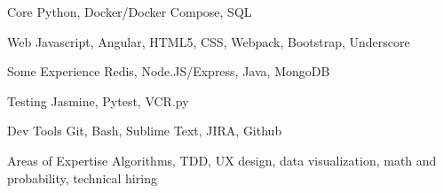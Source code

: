 

\begin{cvskills}

  \cvskill
    {Core}
    {Python, Docker/Docker Compose, SQL}

  \cvskill
    {Web}
    {Javascript, Angular, HTML5, CSS, Webpack, Bootstrap, Underscore}

  \cvskill
    {Some Experience}
    {Redis, Node.JS/Express, Java, MongoDB}

  \cvskill
    {Testing}
    {Jasmine, Pytest, VCR.py}

  \cvskill
    {Dev Tools}
    {Git, Bash, Sublime Text, JIRA, Github}

  \cvskill
    {Areas of Expertise}
    {Algorithms, TDD, UX design, data visualization, math and probability, technical hiring}

\end{cvskills}
